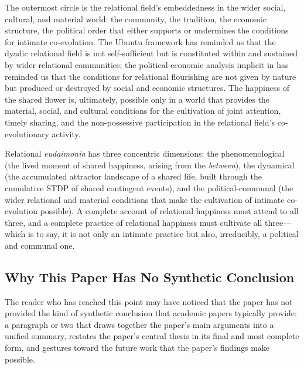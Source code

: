 The outermost circle is the relational field's embeddedness in the wider social, cultural, and material world: the community, the tradition, the economic structure, the political order that either supports or undermines the conditions for intimate co-evolution. The Ubuntu framework has reminded us that the dyadic relational field is not self-sufficient but is constituted within and sustained by wider relational communities; the political-economic analysis implicit in  has reminded us that the conditions for relational flourishing are not given by nature but produced or destroyed by social and economic structures. The happiness of the shared flower is, ultimately, possible only in a world that provides the material, social, and cultural conditions for the cultivation of joint attention, timely sharing, and the non-possessive participation in the relational field's co-evolutionary activity.

\begin{claim}
Relational \emph{eudaimonia} has three concentric dimensions: the phenomenological (the lived moment of shared happiness, arising from the \emph{between}), the dynamical (the accumulated attractor landscape of a shared life, built through the cumulative STDP of shared contingent events), and the political-communal (the wider relational and material conditions that make the cultivation of intimate co-evolution possible). A complete account of relational happiness must attend to all three, and a complete practice of relational happiness must cultivate all three---which is to say, it is not only an intimate practice but also, irreducibly, a political and communal one.
\end{claim}

\subsection{Why This Paper Has No Synthetic Conclusion}
\label{p14:subsec:nosynthesis}

\noindent
The reader who has reached this point may have noticed that the paper has not provided the kind of synthetic conclusion that academic papers typically provide: a paragraph or two that draws together the paper's main arguments into a unified summary, restates the paper's central thesis in its final and most complete form, and gestures toward the future work that the paper's findings make possible.

